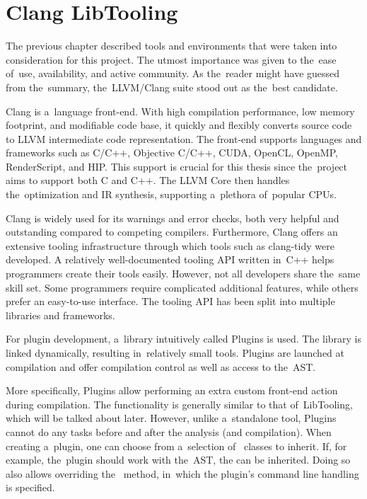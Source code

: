 \chapter{Clang LibTooling}

The previous chapter described tools and environments that were taken
into consideration for this project. 
The utmost importance was given to the~ease of~use, availability, and 
active community. 
As the~reader might have guessed from the~summary, the~LLVM/Clang 
suite stood out as the~best candidate.

Clang is a~language front-end. With high compilation performance, 
low memory footprint, and modifiable code base, it quickly and flexibly 
converts source code to LLVM intermediate code representation. 
The front-end supports languages and frameworks such as C/C++, 
Objective C/C++, CUDA, OpenCL, OpenMP, RenderScript, and HIP. 
This support is crucial for this thesis since the~project 
aims to support both C and C++. 
The LLVM Core then handles the~optimization and IR synthesis, 
supporting a~plethora of~popular CPUs.

Clang is widely used for its warnings and error checks, both very 
helpful and outstanding compared to competing compilers. 
Furthermore, Clang offers an extensive tooling infrastructure 
through which tools such as clang-tidy were developed. 
A relatively well-documented tooling API written in~C++ helps 
programmers create their tools easily. 
However, not all developers share the~same skill set. 
Some programmers require complicated additional features, while others 
prefer an easy-to-use interface. 
The tooling API has been split into multiple libraries and frameworks. 

For plugin development, a~library intuitively called Plugins is used.
The library is linked dynamically, resulting in~relatively small tools.
Plugins are launched at compilation and offer compilation control as well 
as access to the~AST.

More specifically, Plugins allow performing an extra custom front-end action 
during compilation.
The functionality is generally similar to that of~LibTooling, which will be 
talked about later.
However, unlike a~standalone tool, Plugins cannot do any tasks before and after 
the analysis (and compilation).
When creating a~plugin, one can choose from a~selection of~
 classes to inherit.
If, for example, the~plugin should work with the~AST, 
the  can be inherited.
Doing so also allows overriding the~ method, in~which 
the plugin's command line handling is specified.

